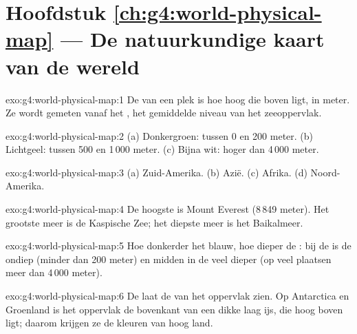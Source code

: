 \section*{Hoofdstuk \ref{ch:g4:world-physical-map} --- De natuurkundige kaart van de wereld}

\begin{solution}{exo:g4:world-physical-map:1}
De  van een plek is hoe hoog die boven  ligt, in meter. Ze
wordt gemeten vanaf het , het gemiddelde niveau van het
zeeoppervlak.
\end{solution}

\begin{solution}{exo:g4:world-physical-map:2}
(a) Donkergroen: tussen 0 en 200 meter. (b) Lichtgeel: tussen 500 en
1\,000 meter. (c) Bijna wit: hoger dan 4\,000 meter.
\end{solution}

\begin{solution}{exo:g4:world-physical-map:3}
(a) Zuid-Amerika. (b) Azië. (c) Afrika. (d) Noord-Amerika.
\end{solution}

\begin{solution}{exo:g4:world-physical-map:4}
De hoogste  is Mount Everest (8\,849 meter). Het grootste meer is de
Kaspische Zee; het diepste meer is het Baikalmeer.
\end{solution}

\begin{solution}{exo:g4:world-physical-map:5}
Hoe donkerder het blauw, hoe dieper de : bij de  is de  ondiep
(minder dan 200 meter) en midden in de  veel dieper (op veel plaatsen
meer dan 4\,000 meter).
\end{solution}

\begin{solution}{exo:g4:world-physical-map:6}
De  laat de  van het oppervlak zien. Op Antarctica
en Groenland is het oppervlak de bovenkant van een dikke laag ijs, die hoog
boven  ligt; daarom krijgen ze de kleuren van hoog land.
\end{solution}

